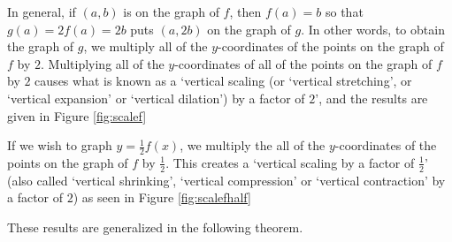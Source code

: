 
In general, if $(a,b)$ is on the graph of $f$, then $f(a) = b$ so that $g(a) = 2 f(a) = 2b$ puts $(a,2b)$ on the graph of $g$.  In other words, to obtain the graph of $g$, we multiply all of the $y$-coordinates of the points on the graph of $f$ by $2$.  Multiplying all of the $y$-coordinates of all of the points on the graph of $f$ by $2$ causes what is known as a `vertical scaling (or `vertical stretching', or `vertical expansion' or `vertical dilation') by a factor of $2$', and the results are given in Figure \ref{fig:scalef} 

If we wish to graph $y = \frac{1}{2} f(x)$, we multiply the all of the $y$-coordinates of the points on the graph of $f$ by $\frac{1}{2}$.  This creates a `vertical scaling  by a factor of $\frac{1}{2}$' (also called `vertical shrinking', `vertical compression' or `vertical contraction' by a factor of $2$) as seen in Figure \ref{fig:scalefhalf}



These results are generalized in the following theorem.

\medskip


